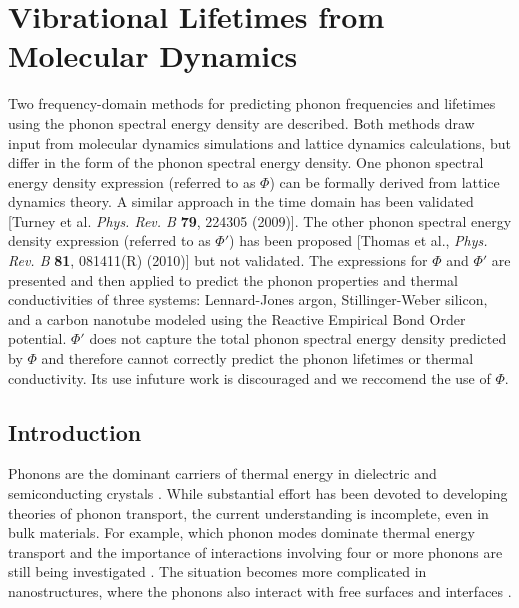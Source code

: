 \chapter{Vibrational Lifetimes from Molecular Dynamics}

Two frequency-domain methods for predicting phonon frequencies and 
lifetimes
using the phonon spectral energy density are described. Both methods draw
input from molecular dynamics simulations and lattice dynamics 
calculations,
but differ in the form of the phonon spectral energy density.
One phonon spectral energy density expression (referred to as $\Phi$) 
can be
formally derived from lattice dynamics theory. A similar approach in the
time domain has been validated [Turney et al. \emph{Phys. Rev. B} 
\textbf{79}, 224305
(2009)]. The other phonon spectral energy density expression 
(referred to as
$\Phi'$) has been proposed [Thomas et al., \emph{Phys. Rev. B} 
\textbf{81}, 081411(R) (2010)]
but not validated. The expressions for $\Phi$ and $\Phi'$ are 
presented and then
applied to predict the phonon properties and thermal conductivities 
of three
systems: Lennard-Jones argon, Stillinger-Weber silicon, and a carbon
nanotube modeled using the Reactive Empirical Bond Order potential. 
$\Phi'$ does not capture the total
phonon spectral energy density predicted by $\Phi$ and therefore 
cannot
correctly predict the phonon lifetimes or thermal conductivity. Its 
use infuture work is discouraged and we reccomend the use of $\Phi$.
\section{\label{Section_Introduction}Introduction}
Phonons are the dominant carriers of thermal energy in dielectric
and semiconducting crystals 
\cite{cahill_nanoscale_2003,mcconnell_thermal_2005,
srivastava_physics_1990,wallace_thermodynamics_1972,
maradudin_dynamical_1974,dove_introduction_1993}. While
substantial effort has been devoted to developing theories of phonon
transport, the current understanding is incomplete, even in bulk 
materials. For
example, which phonon modes dominate thermal energy transport and the 
importance of
interactions involving four or more phonons are still being investigated 
\cite{wallace_thermodynamics_1972,srivastava_physics_1990,
broido_intrinsic_2007,esfarjani_heat_2011,cahill_nanoscale_2003}. The
situation becomes more complicated in nanostructures, where the phonons 
also interact with free surfaces and interfaces 
\cite{asheghi_phonon-boundary_1997,balandin_significant_1998,
lee_heat_1997,tian_importance_2011,hochbaum_enhanced_2008,
martin_impact_2009,he_thermal_2011,hopkins_reduction_2011,
landry_complex_2008,mcgaughey_size-independent_2011,
landry_effect_2009,landry_thermal_2009,landry_effect_2010}.


